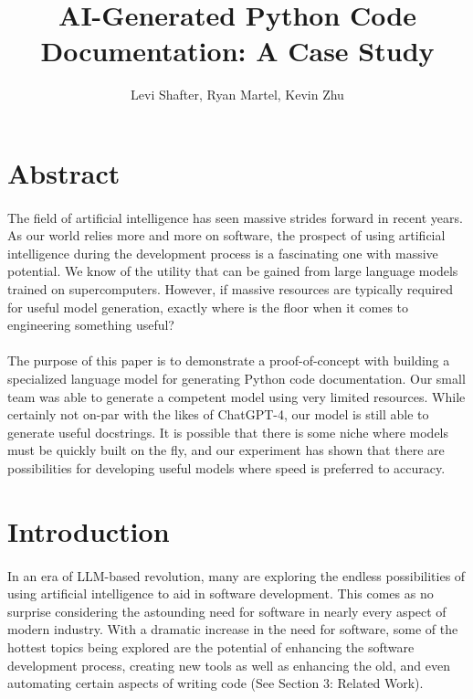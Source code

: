 \documentclass[12pt]{article}
\begin{document}
	\title{ AI-Generated Python Code Documentation: A Case Study }
	\author{Levi Shafter, Ryan Martel, Kevin Zhu}
	\maketitle

	\section*{Abstract}
	\paragraph{} The field of artificial intelligence has seen massive strides forward in recent years. As our world relies more and more on software, the prospect of using artificial intelligence during the development process is a fascinating one with massive potential. We know of the utility that can be gained from large language models trained on supercomputers. However, if massive resources are typically required for useful model generation, exactly where is the floor when it comes to engineering something useful? 
	\paragraph{} The purpose of this paper is to demonstrate a proof-of-concept with building a specialized language model for generating Python code documentation. Our small team was able to generate a competent model using very limited resources. While certainly not on-par with the likes of ChatGPT-4, our model is still able to generate useful docstrings. It is possible that there is some niche where models must be quickly built on the fly, and our experiment has shown that there are possibilities for developing useful models where speed is preferred to accuracy. 

	\section{Introduction}
	\paragraph{} In an era of LLM-based revolution, many are exploring the endless possibilities of using artificial intelligence to aid in software development. This comes as no surprise considering the astounding need for software in nearly every aspect of modern industry. \cite{emerald2019csrImpact} With a dramatic increase in the need for software, some of the hottest topics being explored are the potential of enhancing the software development process, creating new tools as well as enhancing the old, and even automating certain aspects of writing code (See Section 3: Related Work). 
\end{document}
